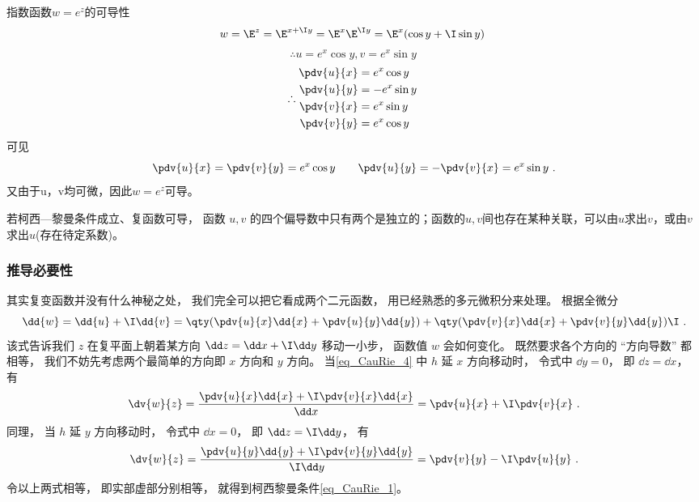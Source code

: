 \begin{example}{指数函数$w=e^z$的可导性}
$$w = \E^z = \E^{x + \I y} = \E^x \E^{\I y}=\E^x(\cos y + \I\sin y)~
$$
$$\therefore u=e^x\cos y, v = e^x\sin y~
$$
$$
\therefore
\begin{aligned}
\pdv{u}{x} &= e^x\cos y\\
\pdv{u}{y} &= -e^x\sin y\\
\pdv{v}{x} &= e^x\sin y\\
\pdv{v}{y} &= e^x\cos y\\
\end{aligned}~
$$
可见
\begin{equation}
\pdv{u}{x} = \pdv{v}{y}= e^x\cos y \qquad
\pdv{u}{y} = - \pdv{v}{x}= e^x\sin y~.
\end{equation}
又由于u，v均可微，因此$w=e^z$可导。
\end{example}

若柯西—黎曼条件成立、复函数可导， 函数 $u,v$ 的四个偏导数中只有两个是独立的；函数的$u,v$间也存在某种关联，可以由$u$求出$v$，或由$v$求出$u$(存在待定系数)。

\subsubsection{推导必要性}
其实复变函数并没有什么神秘之处， 我们完全可以把它看成两个二元函数， 用已经熟悉的多元微积分来处理。 根据全微分
\begin{equation}\label{eq_CauRie_2}
\dd{w} = \dd{u} + \I \dd{v} = \qty(\pdv{u}{x} \dd{x} + \pdv{u}{y} \dd{y}) + \qty(\pdv{v}{x} \dd{x} + \pdv{v}{y} \dd{y})\I~.
\end{equation}
该式告诉我们 $z$ 在复平面上朝着某方向 $\dd z = \dd x + \I \dd y$ 移动一小步， 函数值 $w$ 会如何变化。 既然要求各个方向的 “方向导数” 都相等， 我们不妨先考虑两个最简单的方向即 $x$ 方向和 $y$ 方向。 当\autoref{eq_CauRie_4} 中 $h$ 延 $x$ 方向移动时， 令式中 $\dd y = 0$， 即 $\dd z = \dd x$， 有
\begin{equation}
\dv{w}{z} = \frac{\pdv{u}{x} \dd{x} +  \I\pdv{v}{x} \dd{x}}{\dd x} = \pdv{u}{x} +  \I\pdv{v}{x}~.
\end{equation}
同理， 当 $h$ 延 $y$ 方向移动时， 令式中 $\dd x = 0$， 即 $\dd z = \I\dd y$， 有
\begin{equation}
\dv{w}{z} = \frac{\pdv{u}{y} \dd{y} + \I\pdv{v}{y} \dd{y}}{\I \dd y} = \pdv{v}{y} -\I \pdv{u}{y}~.
\end{equation}
令以上两式相等， 即实部虚部分别相等， 就得到柯西黎曼条件\autoref{eq_CauRie_1}。

